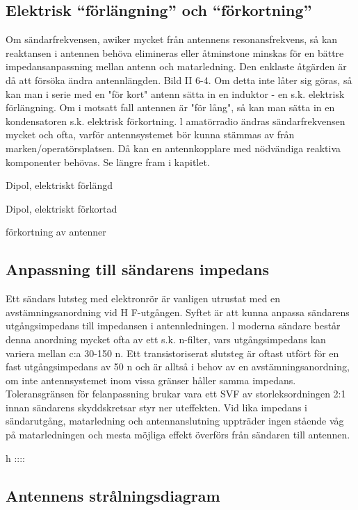 \subsection{Elektrisk ``förlängning'' och ``förkortning''}

Om sändarfrekvensen, awiker mycket från
antennens resonansfrekvens, så kan
reaktansen i antennen behöva elimineras
eller åtminstone minskas för en bättre
impedansanpassning mellan antenn och
matarledning. Den enklaste åtgärden är då
att försöka ändra antennlängden.
Bild II 6-4. Om detta inte låter sig göras,
så kan man i serie med en "för kort" antenn
sätta in en induktor - en s.k. elektrisk förlängning. Om i motsatt fall antennen är "för
lång", så kan man sätta in en kondensatoren s.k. elektrisk förkortning.
l amatörradio ändras sändarfrekvensen
mycket och ofta, varför antennsystemet bör
kunna stämmas av från marken/operatörsplatsen. Då kan en antennkopplare med
nödvändiga reaktiva komponenter behövas.
Se längre fram i kapitlet.

Dipol, elektriskt förlängd

Dipol, elektriskt förkortad

förkortning av antenner

\subsection{Anpassning till sändarens impedans}

Ett sändars lutsteg med elektronrör är vanligen utrustat med en avstämningsanordning
vid H F-utgången. Syftet är att kunna anpassa sändarens utgångsimpedans till impedansen i antennledningen. l moderna sändare består denna anordning mycket ofta av
ett s.k. n-filter, vars utgångsimpedans kan
variera mellan c:a 30-150 n.
Ett transistoriserat slutsteg är oftast utfört för en fast utgångsimpedans av 50 n
och är alltså i behov av en avstämningsanordning, om inte antennsystemet inom vissa
gränser håller samma impedans. Toleransgränsen för felanpassning brukar vara ett
SVF av storleksordningen 2:1 innan sändarens skyddskretsar styr ner uteffekten.
Vid lika impedans i sändarutgång, matarledning och antennanslutning uppträder
ingen stående våg på matarledningen och
mesta möjliga effekt överförs från sändaren
till antennen.

h ::::

\subsection{Antennens strålningsdiagram}

